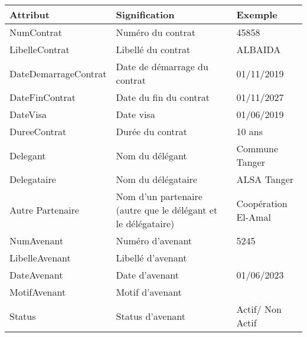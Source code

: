 	\begin{table}[H]
		\begin{center}
			\begin{tabularx}{17.5cm}{|p{3.5cm}|X|p{3.5cm}|}
				\hline
				\textbf{Attribut}    & \textbf{Signification}                                        & \textbf{Exemple}    \\
				\hline
				NumContrat           & Numéro du contrat                                             & 45858               \\
				\hline
				LibelleContrat       & Libellé du contrat                                            & ALBAIDA             \\
				\hline
				DateDemarrageContrat & Date de démarrage du contrat                                  & 01/11/2019          \\
				\hline
				DateFinContrat       & Date du fin du contrat                                        & 01/11/2027          \\
				\hline
				DateVisa             & Date visa                                                     & 01/06/2019          \\
				\hline
				DureeContrat         & Durée du contrat                                              & 10 ans              \\
				\hline
				Delegant             & Nom du délégant                                               & Commune Tanger      \\
				\hline
				Delegataire          & Nom du délégataire                                            & ALSA Tanger         \\
				\hline
				Autre Partenaire     & Nom d'un partenaire (autre que le délégant et le délégataire) & Coopération El-Amal \\
				\hline
				NumAvenant           & Numéro d'avenant                                              & 5245                \\
				\hline
				LibelleAvenant       & Libellé d'avenant                                             &                     \\
				\hline
				DateAvenant          & Date d'avenant                                                & 01/06/2023          \\
				\hline
				MotifAvenant         & Motif d'avenant                                               &                     \\
				\hline
				Status               & Status d'avenant                                              & Actif/ Non Actif    \\

\end{tabularx}
\end{center}
\end{table}
